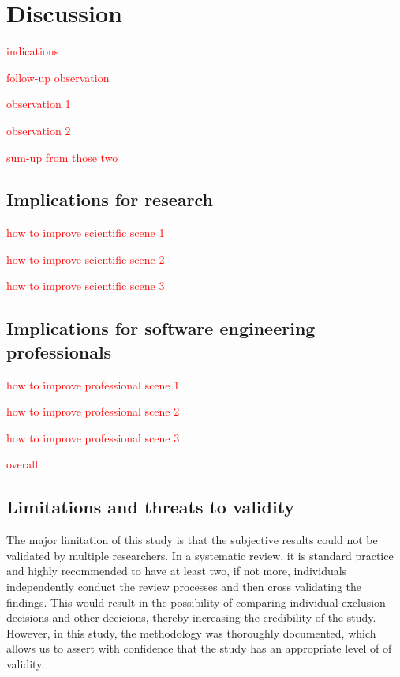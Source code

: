 \chapter{Discussion\label{discussion}}

\textcolor{red}{indications}

\textcolor{red}{follow-up observation}

\textcolor{red}{observation 1}

\textcolor{red}{observation 2}

\textcolor{red}{sum-up from those two}


\section{Implications for research}

\textcolor{red}{how to improve scientific scene 1}

\textcolor{red}{how to improve scientific scene 2}

\textcolor{red}{how to improve scientific scene 3}


\section{Implications for software engineering professionals}

\textcolor{red}{how to improve professional scene 1}

\textcolor{red}{how to improve professional scene 2}

\textcolor{red}{how to improve professional scene 3}

\textcolor{red}{overall}


\section{Limitations and threats to validity}

The major limitation of this study is that the subjective results could not be validated by multiple researchers. In a systematic review, it is standard practice and highly recommended to have at least two, if not more, individuals independently conduct the review processes and then cross validating the findings. This would result in the possibility of comparing individual exclusion decisions and other decicions, thereby increasing the credibility of the study. However, in this study, the methodology was thoroughly documented, which allows us to assert with confidence that the study has an appropriate level of of validity.

